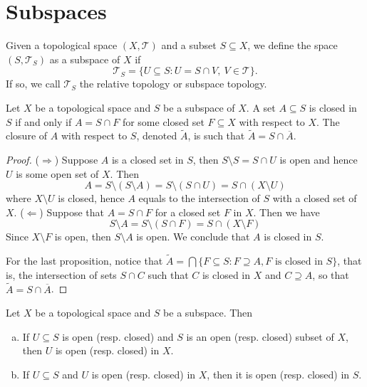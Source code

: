 \section{Subspaces}

\begin{definition}
  \label{def: subspace topology}
  Given a topological space \((X, \mathcal T)\) and a subset \(S \subseteq X\),
  we define the space \((S, \mathcal T_S)\) as a subspace of \(X\) if
  \[
    \mathcal T_S = \{U \subseteq S: U = S \cap V,\ V \in \mathcal T\}.
  \] 
  If so, we call \(\mathcal T_S\) the relative topology or subspace topology.
\end{definition}

\begin{proposition}\label{prop: closed in subspace}
  Let \(X\) be a topological space and \(S\) be a subspace of \(X\). A set \(A
  \subseteq S\) is closed in \(S\) if and only if \(A = S \cap F\) for some
  closed set \(F \subseteq X\) with respect to \(X\). The closure of \(A\) with
  respect to \(S\), denoted \(\widetilde A\), is such that \(\widetilde A = S
  \cap \overline A\).
\end{proposition}

\begin{proof}
  (\(\Rightarrow\)) Suppose \(A\) is a closed set in \(S\), then \(S \setminus
  S = S \cap U\) is open and hence \(U\) is some open set of \(X\). Then 
  \[
    A = S \setminus (S \setminus A) = S \setminus (S \cap U)
    = S \cap (X \setminus U)
  \] 
  where \(X \setminus U\) is closed, hence \(A\) equals to the intersection of
  \(S\) with a closed set of \(X\).
  (\(\Leftarrow\)) Suppose that \(A = S \cap F\) for a closed set \(F\) in
  \(X\). Then we have
  \[
    S \setminus A = S \setminus (S \cap F) = S \cap (X \setminus F)
  \]
  Since \(X\setminus F\) is open, then \(S \setminus A\) is open. We conclude
  that \(A\) is closed in \(S\).

  For the last proposition, notice that \(\widetilde A = \bigcap \{F \subseteq S
  : F \supseteq A, F \text{ is closed in } S\}\), that is, the intersection of
  sets \(S \cap C\) such that \(C\) is closed in \(X\) and \(C \supseteq A\), so
  that \(\widetilde A = S \cap \overline A\).
\end{proof}

\begin{proposition}\label{prop: relative open to open}
  Let \(X\) be a topological space and \(S\) be a subspace. Then
  \begin{enumerate}[(a)]
    \item If \(U \subseteq S\) is open (resp. closed) and \(S\) is an open
      (resp. closed) subset of \(X\), then \(U\) is open (resp. closed) in
      \(X\). 
    \item If \(U \subseteq S\) and \(U\) is open (resp. closed) in \(X\), then
      it is open (resp. closed) in \(S\).
  \end{enumerate}
\end{proposition}

